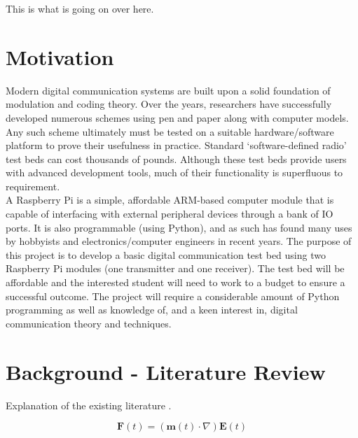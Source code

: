 \documentclass[../main.tex]{subfiles}
\begin{document}
This is what is going on over here.


\section{Motivation}
Modern digital communication systems are built upon a solid foundation of modulation and coding theory.
Over the years, researchers have successfully developed numerous schemes using pen and paper along with computer models.
Any such scheme ultimately must be tested on a suitable hardware/software platform to prove their usefulness in practice.
Standard ‘software-defined radio’ test beds can cost thousands of pounds.
Although these test beds provide users with advanced development tools, much of their functionality is superfluous to requirement.\\

A Raspberry Pi is a simple, affordable ARM-based computer module that is capable of interfacing with external peripheral devices through a bank of IO ports.
It is also programmable (using Python), and as such has found many uses by hobbyists and electronics/computer engineers in recent years.
The purpose of this project is to develop a basic digital communication test bed using two Raspberry Pi modules (one transmitter and one receiver).
The test bed will be affordable and the interested student will need to work to a budget to ensure a successful outcome.
The project will require a considerable amount of Python programming as well as knowledge of, and a keen interest in, digital communication theory and techniques.


\section{Background - Literature Review} \label{sec_Lit Review}


Explanation of the existing literature \cite{DhirNIPS2017}.

\begin{equation} \label{bla}
\textbf{F}(t) = (\textbf{m}(t)\cdot\nabla)\textbf{E}(t)
\end{equation}
\end{document}
